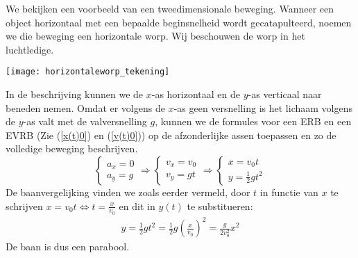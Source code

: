 \documentclass{ximera}
\begin{document}
	\author{Bart Lambregs}
    \xmsource\xmuitleg





	We bekijken een voorbeeld van een tweedimensionale beweging. Wanneer een object horizontaal met een bepaalde beginsnelheid wordt gecatapulteerd, noemen we die beweging een horizontale worp. Wij beschouwen de worp in het luchtledige.
	\begin{image}
	
	\texttt{[image: horizontaleworp\_tekening]}
	\end{image}
	In de beschrijving kunnen we de $x$-as horizontaal en de $y$-as verticaal naar beneden nemen. Omdat er volgens de $x$-as geen versnelling is het lichaam volgens de $y$-as valt met de valversnelling $g$, kunnen we de formules voor een ERB en een EVRB (Zie (\ref{x(t)0}) en (\ref{v(t)0})) op de afzonderlijke assen toepassen en zo de volledige beweging beschrijven.%
	\begin{equation*}
	\left\{
	\begin{array}{l}
	a_x=0\\
	a_y=g
	\end{array}
	\right.
	\Rightarrow
	\left\{
	\begin{array}{l}
	v_x=v_0\\
	v_y=gt
	\end{array}
	\right.
	\Rightarrow
	\left\{
	\begin{array}{l}
	x=v_0t\\
	y=\frac{1}{2}gt^2
	\end{array}
	\right.
	\end{equation*}
	De baanvergelijking vinden we zoals eerder vermeld, door $t$ in functie van $x$ te schrijven $x=v_0t\Leftrightarrow t=\frac{x}{v_0}$ en dit in $y(t)$ te substitueren:
	\begin{eqnarray*}
	y=\frac{1}{2}gt^2=\frac{1}{2}g\left(\frac{x}{v_0}\right)^2=\frac{g}{2v_0^2}x^2
	\end{eqnarray*}
	De baan is dus een parabool.
	
\end{document}
